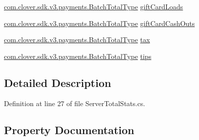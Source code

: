 \begin{DoxyCompactItemize}
\item 
\hyperlink{classcom_1_1clover_1_1sdk_1_1v3_1_1payments_1_1_batch_total_type}{com.\+clover.\+sdk.\+v3.\+payments.\+Batch\+Total\+Type} \hyperlink{classcom_1_1clover_1_1sdk_1_1v3_1_1payments_1_1_server_total_stats_a70a712618048ce93eda30da2cbfcd779}{gift\+Card\+Loads}
\item 
\hyperlink{classcom_1_1clover_1_1sdk_1_1v3_1_1payments_1_1_batch_total_type}{com.\+clover.\+sdk.\+v3.\+payments.\+Batch\+Total\+Type} \hyperlink{classcom_1_1clover_1_1sdk_1_1v3_1_1payments_1_1_server_total_stats_a0a877f322ad7471660573ce8eeb80ddc}{gift\+Card\+Cash\+Outs}
\item 
\hyperlink{classcom_1_1clover_1_1sdk_1_1v3_1_1payments_1_1_batch_total_type}{com.\+clover.\+sdk.\+v3.\+payments.\+Batch\+Total\+Type} \hyperlink{classcom_1_1clover_1_1sdk_1_1v3_1_1payments_1_1_server_total_stats_acb6066ace4adff8c163a29d751c4eb4a}{tax}
\item 
\hyperlink{classcom_1_1clover_1_1sdk_1_1v3_1_1payments_1_1_batch_total_type}{com.\+clover.\+sdk.\+v3.\+payments.\+Batch\+Total\+Type} \hyperlink{classcom_1_1clover_1_1sdk_1_1v3_1_1payments_1_1_server_total_stats_aec31033b6435c633fdf3a88e55b3b6ff}{tips}
\end{DoxyCompactItemize}


\subsection{Detailed Description}


Definition at line 27 of file Server\+Total\+Stats.\+cs.



\subsection{Property Documentation}
\mbox{\label{classcom_1_1clover_1_1sdk_1_1v3_1_1payments_1_1_server_total_stats_a9f0cf0d1a1508785839473b3d10892d5}} 
